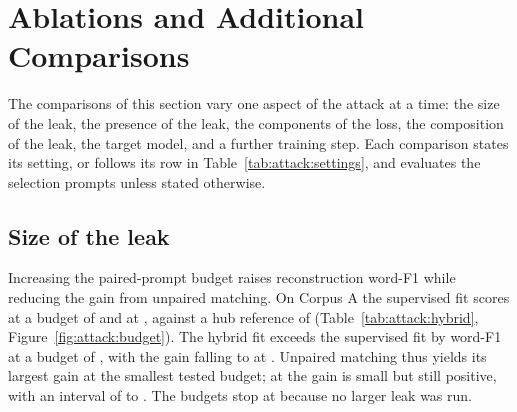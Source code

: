 \section{Ablations and Additional Comparisons}\label{sec:attack:ablations}\label{sec:attack:negative}

The comparisons of this section vary one aspect of the attack at a time: the size of the leak, the presence of the leak, the components of the loss, the composition of the leak, the target model, and a further training step.
Each comparison states its setting, or follows its row in Table~\ref{tab:attack:settings}, and evaluates the  selection prompts unless stated otherwise.

\subsection{Size of the leak}\label{sec:attack:budget}

Increasing the paired-prompt budget raises reconstruction word-F1 while reducing the gain from unpaired matching.
On Corpus A the supervised fit scores  at a budget of  and  at , against a hub reference of  (Table~\ref{tab:attack:hybrid}, Figure~\ref{fig:attack:budget}). %
The hybrid fit exceeds the supervised fit by  word-F1 at a budget of , with the gain falling to  at . %
Unpaired matching thus yields its largest gain at the smallest tested budget; at  the gain is small but still positive, with an interval of  to .
The budgets stop at  because no larger leak was run.

